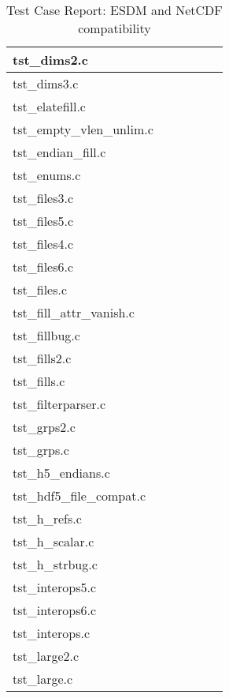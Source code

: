 \begin{table}[H]
\begin{tabular}{|m{2cm}|m{3cm}|m{3cm}|m{3cm}|m{3cm}|m{2cm}|}
tst\_dims2.c   &   &   &   &   &   \\ \hline
tst\_dims3.c   &   &   &   &   &   \\ \hline
tst\_elatefill.c   &   &   &   &   &   \\ \hline
tst\_empty\_vlen\_unlim.c   &   &   &   &   &   \\ \hline
tst\_endian\_fill.c   &   &   &   &   &   \\ \hline
tst\_enums.c   &   &   &   &   &   \\ \hline
tst\_files3.c   &   &   &   &   &   \\ \hline
tst\_files5.c   &   &   &   &   &   \\ \hline
tst\_files4.c   &   &   &   &   &   \\ \hline
tst\_files6.c   &   &   &   &   &   \\ \hline
tst\_files.c   &   &   &   &   &   \\ \hline
tst\_fill\_attr\_vanish.c   &   &   &   &   &   \\ \hline
tst\_fillbug.c   &   &   &   &   &   \\ \hline
tst\_fills2.c   &   &   &   &   &   \\ \hline
tst\_fills.c   &   &   &   &   &   \\ \hline
tst\_filterparser.c   &   &   &   &   &   \\ \hline
tst\_grps2.c   &   &   &   &   &   \\ \hline
tst\_grps.c   &   &   &   &   &   \\ \hline
tst\_h5\_endians.c   &   &   &   &   &   \\ \hline
tst\_hdf5\_file\_compat.c   &   &   &   &   &   \\ \hline
tst\_h\_refs.c   &   &   &   &   &   \\ \hline
tst\_h\_scalar.c   &   &   &   &   &   \\ \hline
tst\_h\_strbug.c   &   &   &   &   &   \\ \hline
tst\_interops5.c   &   &   &   &   &   \\ \hline
tst\_interops6.c   &   &   &   &   &   \\ \hline
tst\_interops.c   &   &   &   &   &   \\ \hline
tst\_large2.c   &   &   &   &   &   \\ \hline
tst\_large.c   &   &   &   &   &   \\ \hline
\hline
\end{tabular}
\caption{Test Case Report: ESDM and NetCDF compatibility}
\end{table}

